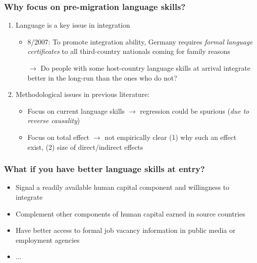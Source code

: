 \documentclass{beamer}
\begin{document}
\begin{frame}
\frametitle{Why focus on pre-migration language skills?}

\begin{enumerate}

\item Language is a key issue in integration

\begin{itemize}
\item 8/2007: To promote integration ability, Germany requires \textit{formal language certificates} to all third-country nationals coming for family reasons  

$\rightarrow$ Do people with some host-country language skills at arrival integrate better in the long-run than the ones who do not? \\
\end{itemize}

\item Methodological issues in previous literature:

\begin{itemize}
\item Focus on current language skills $\rightarrow$ regression could be spurious (\textit{due to reverse causality}) \\
\item Focus on total effect $\rightarrow$  not empirically clear (1) why such an effect exist, (2) size of direct/indirect effects
\end{itemize}

\end{enumerate}

\end{frame}


\begin{frame}
\frametitle{What if you have better language skills at entry?}

\begin{itemize}
\item Signal a readily available human capital component and willingness to integrate
\item Complement other components of human capital earned in source countries 
\item Have better access to formal job vacancy information in public media or employment agencies
\item ...
\end{itemize}

\end{frame}
\end{document}

